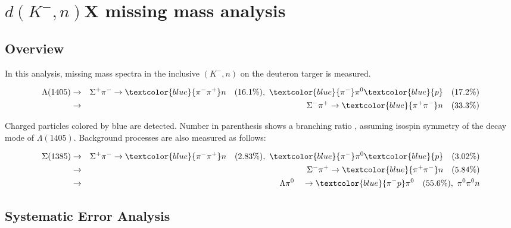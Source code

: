 \section{ $d(K^-,n)$X missing mass analysis }
\subsection{Overview}
In this analysis, missing mass spectra in the inclusive $(K^-,n)$ on the deuteron targer is measured.

\begin{eqnarray}
\Lambda (1405) & \rightarrow & \Sigma^+\pi^-  \rightarrow \textcolor{blue}{\pi^-\pi^+}n \quad (16.1\%),\ \textcolor{blue}{\pi^-}\pi^0 \textcolor{blue}{p} \quad (17.2\%)  \nonumber \\
               & \rightarrow & \Sigma^-\pi^+  \rightarrow \textcolor{blue}{\pi^+\pi^-}n \quad (33.3\%)
\end{eqnarray}

Charged particles colored by blue are detected. Number in parenthesis shows a branching ratio , assuming isospin symmetry of the decay mode of $\Lambda (1405)$.
Background processes are also measured as follows:

\begin{eqnarray}
\Sigma (1385) & \rightarrow & \Sigma^+ \pi^-  \rightarrow  \textcolor{blue}{\pi^- \pi^+}n  \quad (2.83\%),\ \textcolor{blue}{\pi^-}\pi^0 \textcolor{blue}{p} \quad (3.02\%)  \nonumber \\
              & \rightarrow & \Sigma^- \pi^+  \rightarrow  \textcolor{blue}{\pi^+ \pi^-}n  \quad (5.84\%) \nonumber \\
              & \rightarrow & \Lambda  \pi^0 \quad  \rightarrow  \textcolor{blue}{\pi^- p} \pi^0 \quad (55.6\%),\ \pi^0\pi^0n
\end{eqnarray}





\subsection{Systematic Error Analysis}
